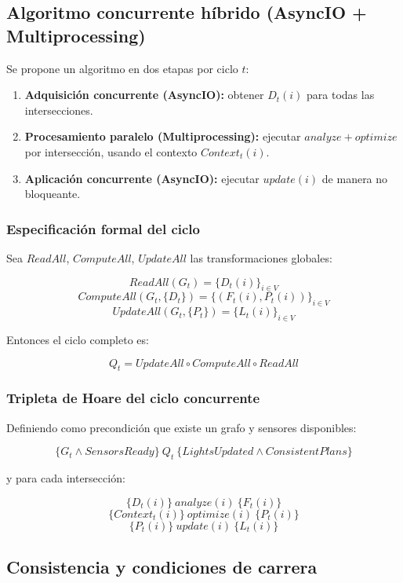 \documentclass[12pt]{article}
\begin{document}
\subsection{Algoritmo concurrente híbrido (AsyncIO + Multiprocessing)}

Se propone un algoritmo en dos etapas por ciclo \(t\):

\begin{enumerate}
\item \textbf{Adquisición concurrente (AsyncIO):} obtener \(D_t(i)\) para todas las intersecciones.
\item \textbf{Procesamiento paralelo (Multiprocessing):} ejecutar \(analyze+optimize\) por intersección, usando el contexto \(Context_t(i)\).
\item \textbf{Aplicación concurrente (AsyncIO):} ejecutar \(update(i)\) de manera no bloqueante.
\end{enumerate}

\subsubsection{Especificación formal del ciclo}

Sea \(ReadAll\), \(ComputeAll\), \(UpdateAll\) las transformaciones globales:

\[
ReadAll(G_t) = \{D_t(i)\}_{i\in V}
\]
\[
ComputeAll(G_t,\{D_t\}) = \{(F_t(i), P_t(i))\}_{i\in V}
\]
\[
UpdateAll(G_t,\{P_t\}) = \{L_t(i)\}_{i\in V}
\]

Entonces el ciclo completo es:

\[
Q_t = UpdateAll \circ ComputeAll \circ ReadAll
\]

\subsubsection{Tripleta de Hoare del ciclo concurrente}

Definiendo como precondición que existe un grafo y sensores disponibles:

\[
\{G_t \wedge SensorsReady\} \ Q_t \ \{LightsUpdated \wedge ConsistentPlans\}
\]

y para cada intersección:

\[
\{D_t(i)\} \ analyze(i)\ \{F_t(i)\}
\]
\[
\{Context_t(i)\} \ optimize(i)\ \{P_t(i)\}
\]
\[
\{P_t(i)\} \ update(i)\ \{L_t(i)\}
\]

\subsection{Consistencia y condiciones de carrera}
\end{document}
